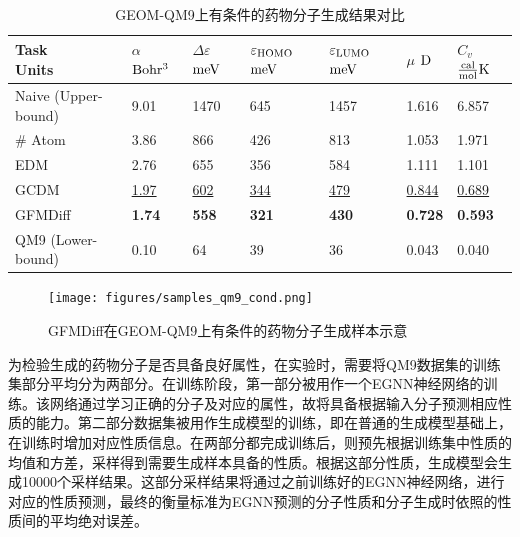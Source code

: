\begin{table}[h]
    \centering
    \caption{GEOM-QM9上有条件的药物分子生成结果对比}
    \label{tab:gen_qm9_condition}
    \begin{tabular}{lllllll}
    \toprule
    \makecell[l]{Task\\Units} & \makecell[l]{$\alpha$\\${\rm Bohr^3}$} & \makecell[l]{$\Delta \varepsilon$\\${\rm meV}$} & \makecell[l]{$\varepsilon_{{\rm HOMO}}$\\${\rm meV}$} & \makecell[l]{$\varepsilon_{{\rm LUMO}}$\\${\rm meV}$} & \makecell[l]{$\mu$\\${\rm D}$} & \makecell[l]{$C_v$\\$\frac{{\rm cal}}{{\rm mol}}{\rm K}$} \\
    \midrule
    Naive (Upper-bound) & 9.01 & 1470 & 645 & 1457 & 1.616 & 6.857 \\
    \# Atom & 3.86 & 866 & 426 & 813 & 1.053 & 1.971 \\
    EDM & 2.76 & 655 & 356 & 584 & 1.111 & 1.101 \\
    GCDM & \underline{1.97} & \underline{602} & \underline{344} & \underline{479} & \underline{0.844} & \underline{0.689} \\
    GFMDiff & \textbf{1.74} & \textbf{558} & \textbf{321} & \textbf{430} & \textbf{0.728} & \textbf{0.593} \\
    QM9 (Lower-bound) & 0.10 & 64 & 39 & 36 & 0.043 & 0.040 \\
    \bottomrule
    \end{tabular}
\end{table}

\begin{figure}[h]
    \centering
    \texttt{[image: figures/samples\_qm9\_cond.png]}
    \caption{GFMDiff在GEOM-QM9上有条件的药物分子生成样本示意}
    \label{fig:samples_qm9_cond}
\end{figure}

为检验生成的药物分子是否具备良好属性，在实验时，需要将QM9数据集的训练集部分平均分为两部分。在训练阶段，第一部分被用作一个EGNN\cite{egnn_satorras_21}神经网络的训练。该网络通过学习正确的分子及对应的属性，故将具备根据输入分子预测相应性质的能力。第二部分数据集被用作生成模型的训练，即在普通的生成模型基础上，在训练时增加对应性质信息。在两部分都完成训练后，则预先根据训练集中性质的均值和方差，采样得到需要生成样本具备的性质。根据这部分性质，生成模型会生成10000个采样结果。这部分采样结果将通过之前训练好的EGNN神经网络，进行对应的性质预测，最终的衡量标准为EGNN预测的分子性质和分子生成时依照的性质间的平均绝对误差。

